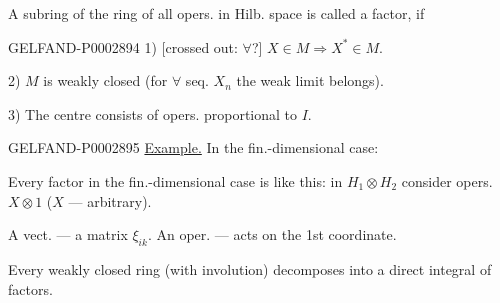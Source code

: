 A subring of the ring of all opers. in Hilb. space is called a factor, if

\begin{GelfandAdjacentEvidence}{GELFAND-P000289}{4}
1) [crossed out: $\forall$?] $X\in M\Longrightarrow X^*\in M$.

\end{GelfandAdjacentEvidence}


2) $M$ is weakly closed (for $\forall$ seq. $X_n$ the weak limit belongs).

3) The centre consists of opers. proportional to $I$.

\begin{GelfandAdjacentEvidence}{GELFAND-P000289}{5}
\underline{Example.} In the fin.-dimensional case:





\end{GelfandAdjacentEvidence}


Every factor in the fin.-dimensional case is like this: in $H_1\otimes H_2$ consider opers. $X\otimes1$ ($X$ --- arbitrary).

A vect. --- a matrix $\xi_{ik}$. An oper. --- acts on the 1st coordinate.

\begin{center}\end{center}

Every weakly closed ring (with involution) decomposes into a direct integral of factors.

